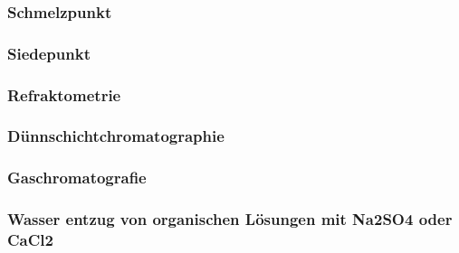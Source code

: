 \subsubsection*{Schmelzpunkt}
\subsubsection*{Siedepunkt}
\subsubsection*{Refraktometrie}
\subsubsection*{Dünnschichtchromatographie}

\subsubsection*{Gaschromatografie}
\subsubsection*{Wasser entzug von organischen Lösungen mit Na2SO4 oder CaCl2}